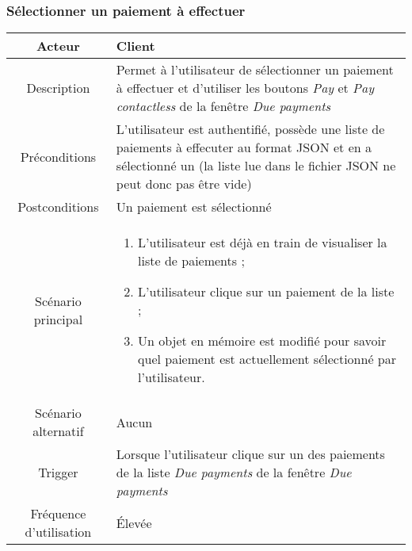 \documentclass{article}
\begin{document}
\newpage


\subsubsection{Sélectionner un paiement à effectuer}
\begin{table}[h!]

\begin{tabular}{|c|p{11cm}|}
\hline
Acteur & Client \\
\hline
Description & Permet à l'utilisateur de sélectionner un paiement à effectuer et d'utiliser les boutons \emph{Pay} et \emph{Pay contactless} de la fenêtre \emph{Due payments} \\
\hline
Préconditions & L'utilisateur est authentifié, possède une liste de paiements à effecuter au format JSON et en a sélectionné un (la liste lue dans le fichier JSON ne peut donc pas être vide) \\
\hline
Postconditions & Un paiement est sélectionné \\
\hline
Scénario principal & \begin{enumerate}
\item L'utilisateur est déjà en train de visualiser la liste de paiements ;
\item L'utilisateur clique sur un paiement de la liste ;
\item Un objet en mémoire est modifié pour savoir quel paiement est actuellement sélectionné par l'utilisateur.
\end{enumerate} \\
\hline
Scénario alternatif & Aucun \\
\hline
Trigger & Lorsque l'utilisateur clique sur un des paiements de la liste \emph{Due payments} de la fenêtre \emph{Due payments} \\
\hline
Fréquence d'utilisation & Élevée \\
\hline
\end{tabular}

\end{table}


\newpage
\end{document}
